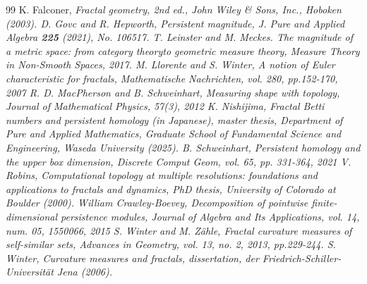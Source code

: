 \documentclass[12pt]{amsart}
\numberwithin{equation}{section}
\begin{document}
\begin{thebibliography}{99}
     K. Falconer, \it Fractal geometry, \rm 2nd ed., John Wiley \& Sons, Inc., Hoboken (2003). 
     D. Govc and R. Hepworth, \it Persistent magnitude, \rm J. Pure and Applied Algebra {\bf 225} (2021), No. 106517. 
     T. Leinster and M. Meckes. \it The magnitude of a metric space: from category theoryto geometric measure theory, \rm Measure Theory in Non-Smooth Spaces, 2017.
     M. Llorente and S. Winter, \it A notion of Euler characteristic for fractals\rm , Mathematische Nachrichten, vol. 280, pp.152-170, 2007
     R. D. MacPherson and B. Schweinhart, \it Measuring shape with topology, \rm Journal of Mathematical Physics, 57(3), 2012
     K. Nishijima, \it Fractal Betti numbers and persistent homology (in Japanese)\rm, master thesis, Department of Pure and Applied Mathematics, Graduate School of Fundamental Science and Engineering, Waseda University (2025).
     B. Schweinhart, \it Persistent homology and the upper box dimension, \rm Discrete Comput Geom, vol. 65, pp. 331-364, 2021
     V. Robins, \it Computational topology at multiple resolutions: foundations and applications to fractals and dynamics, \rm PhD thesis, University of Colorado at Boulder (2000). 
     William Crawley-Boevey, \it Decomposition of pointwise finite-dimensional persistence modules, \rm Journal of Algebra and Its Applications, vol. 14, num. 05, 1550066, 2015
     S. Winter and M. Z\"{a}hle, \it Fractal curvature measures of self-similar sets, \rm  Advances in Geometry, vol. 13, no. 2, 2013, pp.229-244.
     S. Winter, \it Curvature measures and fractals, \rm dissertation, der Friedrich-Schiller-Universit\"at Jena (2006). 
\end{thebibliography}
\end{document}
